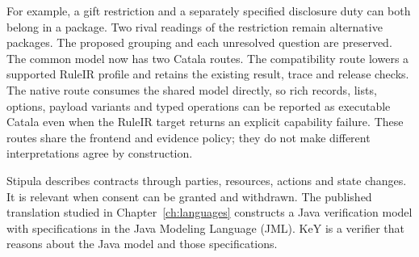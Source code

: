 \documentclass[12pt,a4paper,oneside,openany]{book}
\begin{document}
\begin{MapDiagram}
\end{MapDiagram}

For example, a gift restriction and a separately specified disclosure duty can
both belong in a package. Two rival readings of the restriction remain
alternative packages. The proposed grouping and each unresolved question are
preserved. The common model now has two Catala routes. The compatibility route
lowers a supported RuleIR profile and retains the existing result, trace and
release checks. The native route consumes the shared model directly, so rich
records, lists, options, payload variants and typed operations can be reported
as executable Catala even when the RuleIR target returns an explicit capability
failure. These routes share the frontend and evidence policy; they do not make
different interpretations agree by construction.

\clearpage
{}
Stipula describes contracts through parties, resources, actions and state
changes. It is relevant when consent can be granted and withdrawn. The
published translation studied in Chapter~\ref{ch:languages} constructs a Java
verification model with specifications in the Java Modeling Language (JML).
KeY is a verifier that reasons about the Java model and those specifications.

\begin{MapDiagram}
\end{MapDiagram}
\end{document}
